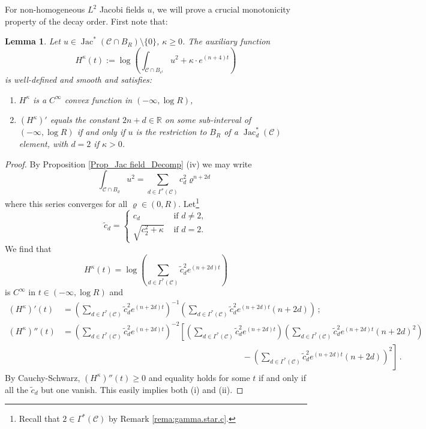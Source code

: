 \documentclass[11pt, letterpaper, reqno]{amsart}
\numberwithin{equation}{section}
\newtheorem{Lem}[Def]{Lemma}
\theoremstyle{remark}
\newcommand{\RR}{\mathbb{R}}
\newcommand{\cC}{\mathcal{C}}
\newcommand{\Jac}{\operatorname{Jac}}
\begin{document}
For non-homogeneous $L^2$ Jacobi fields $u$, we will prove a crucial monotonicity property of the decay order. First note that:

\begin{Lem} \label{Lem_Jac field_Freq Monoton}
      Let $u\in \Jac^*(\cC \cap B_R) \setminus \{0\}$, $\kappa \geq 0$. The auxiliary function
      \[
        H^\kappa(t):= \log\left( \int_{\cC \cap B_{e^t}} u^2 + \kappa \cdot e^{(n+4)t} \right)
      \]
      is well-defined and smooth and satisfies:
      \begin{enumerate}
      	\item[(i)] $H^\kappa$ is a $C^\infty$ convex function in $(-\infty, \log R)$,
	\item[(ii)] $(H^\kappa)'$ equals the constant $2n+d \in \RR$ on some sub-interval of $(-\infty, \log R)$ if and only if $u$ is the restriction to $B_R$ of a $\Jac_d^*(\cC)$ element, with $d=2$ if $\kappa > 0$.
      \end{enumerate}
\end{Lem}
\begin{proof}
      By Proposition \ref{Prop_Jac field_Decomp} {(iv)} we may write
      \[
      \int_{\cC \cap B_\varrho} u^2 = \sum_{d\in \Gamma^*(\cC)} c_d^2 \varrho^{n+2d}\,
      \]
      where this series converges for all $\varrho \in (0,R)$. Let\footnote{Recall that $2 \in \Gamma^*(\cC)$ by Remark \ref{rema:gamma.star.c}.}
      \[
      	\tilde c_d = \begin{cases} c_d & \text{ if } d \neq 2, \\ \sqrt{c_2^2+\kappa} & \text{ if } d = 2. \end{cases}
      \]
      We find that
       \[
        H^\kappa(t) = \log\left( \sum_{d\in \Gamma^*(\cC)} \tilde c_d^2 e^{(n+2d)t} \right)
      \]
      is $C^\infty$ in $t\in (-\infty, \log R)$ and 
      \begin{align*}
        (H^\kappa)'(t) & = \left( \sum_{d\in \Gamma^*(\cC)} \tilde c_d^2 e^{(n+2d)t} \right)^{-1}\left( \sum_{d\in \Gamma^*(\cC)} \tilde c_d^2 e^{(n+2d)t}(n+2d) \right)\,; \\
        (H^\kappa)''(t) & = \left( \sum_{d\in \Gamma^*(\cC)} \tilde c_d^2 e^{(n+2d)t} \right)^{-2}\left[\left( \sum_{d\in \Gamma^*(\cC)} \tilde c_d^2 e^{(n+2d)t} \right)\left( \sum_{d\in \Gamma^*(\cC)}\tilde  c_d^2 e^{(n+2d)t}(n+2d)^2 \right) \right. \\
        & \;\;\;\;\;\;\;\;\;\;\;\;\;\;\;\;\;\;\;\;\;\;\;\;\;\;\;\;\;\;\;\;\;\;\;\;\;\;\;\;\;\;\;\;\;\;\;\;\;\;\;\;\;\;\;\;\;\;\;\;\;\;\;\;\;\;\;\;\;\;\;\;\;\;\;\;\; - \left. \left( \sum_{d\in \Gamma^*(\cC)} \tilde c_d^2 e^{(n+2d)t}(n+2d) \right)^2 \right]\,.        
      \end{align*}
      By Cauchy-Schwarz, $(H^\kappa)''(t)\geq 0$ and equality holds for some $t$ if and only if all the $\tilde c_d$ but one vanish. This easily implies both {(i)} and {(ii)}.
\end{proof}
\end{document}
